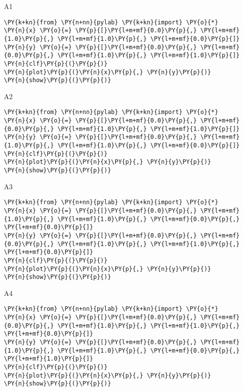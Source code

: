 \begin{enumerate}
\begin{enumerate}
\item[A1] 
\begin{Verbatim}[commandchars=\\\{\}]
\PY{k+kn}{from} \PY{n+nn}{pylab} \PY{k+kn}{import} \PY{o}{*}
\PY{n}{x} \PY{o}{=} \PY{p}{[}\PY{l+m+mf}{0.0}\PY{p}{,} \PY{l+m+mf}{1.0}\PY{p}{,} \PY{l+m+mf}{1.0}\PY{p}{,} \PY{l+m+mf}{0.0}\PY{p}{]}
\PY{n}{y} \PY{o}{=} \PY{p}{[}\PY{l+m+mf}{0.0}\PY{p}{,} \PY{l+m+mf}{0.0}\PY{p}{,} \PY{l+m+mf}{1.0}\PY{p}{,} \PY{l+m+mf}{1.0}\PY{p}{]}
\PY{n}{clf}\PY{p}{(}\PY{p}{)}
\PY{n}{plot}\PY{p}{(}\PY{n}{x}\PY{p}{,} \PY{n}{y}\PY{p}{)}
\PY{n}{show}\PY{p}{(}\PY{p}{)}
\end{Verbatim}
\item[A2] 
\begin{Verbatim}[commandchars=\\\{\}]
\PY{k+kn}{from} \PY{n+nn}{pylab} \PY{k+kn}{import} \PY{o}{*}
\PY{n}{x} \PY{o}{=} \PY{p}{[}\PY{l+m+mf}{0.0}\PY{p}{,} \PY{l+m+mf}{0.0}\PY{p}{,} \PY{l+m+mf}{1.0}\PY{p}{,} \PY{l+m+mf}{1.0}\PY{p}{]}
\PY{n}{y} \PY{o}{=} \PY{p}{[}\PY{l+m+mf}{0.0}\PY{p}{,} \PY{l+m+mf}{1.0}\PY{p}{,} \PY{l+m+mf}{1.0}\PY{p}{,} \PY{l+m+mf}{0.0}\PY{p}{]}
\PY{n}{clf}\PY{p}{(}\PY{p}{)}
\PY{n}{plot}\PY{p}{(}\PY{n}{x}\PY{p}{,} \PY{n}{y}\PY{p}{)}
\PY{n}{show}\PY{p}{(}\PY{p}{)}
\end{Verbatim}
\item[A3] 
\begin{Verbatim}[commandchars=\\\{\}]
\PY{k+kn}{from} \PY{n+nn}{pylab} \PY{k+kn}{import} \PY{o}{*}
\PY{n}{x} \PY{o}{=} \PY{p}{[}\PY{l+m+mf}{0.0}\PY{p}{,} \PY{l+m+mf}{1.0}\PY{p}{,} \PY{l+m+mf}{1.0}\PY{p}{,} \PY{l+m+mf}{0.0}\PY{p}{,} \PY{l+m+mf}{0.0}\PY{p}{]}
\PY{n}{y} \PY{o}{=} \PY{p}{[}\PY{l+m+mf}{0.0}\PY{p}{,} \PY{l+m+mf}{0.0}\PY{p}{,} \PY{l+m+mf}{1.0}\PY{p}{,} \PY{l+m+mf}{1.0}\PY{p}{,} \PY{l+m+mf}{0.0}\PY{p}{]}
\PY{n}{clf}\PY{p}{(}\PY{p}{)}
\PY{n}{plot}\PY{p}{(}\PY{n}{x}\PY{p}{,} \PY{n}{y}\PY{p}{)}
\PY{n}{show}\PY{p}{(}\PY{p}{)}
\end{Verbatim}
\item[A4] 
\begin{Verbatim}[commandchars=\\\{\}]
\PY{k+kn}{from} \PY{n+nn}{pylab} \PY{k+kn}{import} \PY{o}{*}
\PY{n}{x} \PY{o}{=} \PY{p}{[}\PY{l+m+mf}{0.0}\PY{p}{,} \PY{l+m+mf}{0.0}\PY{p}{,} \PY{l+m+mf}{1.0}\PY{p}{,} \PY{l+m+mf}{1.0}\PY{p}{,} \PY{l+m+mf}{0.0}\PY{p}{]}
\PY{n}{y} \PY{o}{=} \PY{p}{[}\PY{l+m+mf}{0.0}\PY{p}{,} \PY{l+m+mf}{1.0}\PY{p}{,} \PY{l+m+mf}{1.0}\PY{p}{,} \PY{l+m+mf}{0.0}\PY{p}{,} \PY{l+m+mf}{1.0}\PY{p}{]}
\PY{n}{clf}\PY{p}{(}\PY{p}{)}
\PY{n}{plot}\PY{p}{(}\PY{n}{x}\PY{p}{,} \PY{n}{y}\PY{p}{)}
\PY{n}{show}\PY{p}{(}\PY{p}{)}
\end{Verbatim}
\end{enumerate}


\end{enumerate}
